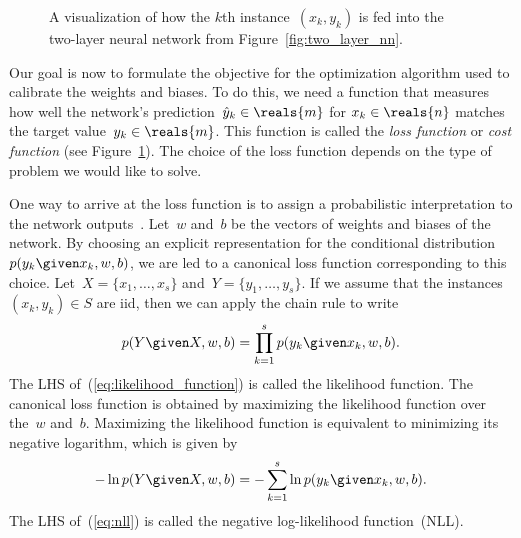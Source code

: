 \documentclass[11pt,a4paper]{article}
\numberwithin{equation}{section}
\begin{document}
\begin{figure}
\caption{A visualization of how the $k$th instance~$(x_k, y_k)$ is fed into the
two-layer neural network from
Figure~\ref{fig:two_layer_nn}.\label{fig:nn_with_loss}}
\end{figure}

Our goal is now to formulate the objective for the optimization algorithm used
to calibrate the weights and biases. To do this, we need a function that
measures how well the network's prediction~$\hat{y}_k \in \reals{m}$ for $x_k
\in \reals{n}$ matches the target value~$y_k \in \reals{m}$. This function is
called the \emph{loss function} or \emph{cost function} (see
Figure~\ref{fig:nn_with_loss}). The choice of the loss function depends on the
type of problem we would like to solve.

One way to arrive at the loss function is to assign a probabilistic
interpretation to the network outputs~\citep{ml_bishop}. Let~$w$ and~$b$ be the
vectors of weights and biases of the network. By choosing an explicit
representation for the conditional distribution~$p(y_k \given x_k, w, b)$, we
are led to a canonical loss function corresponding to this choice. Let~$X =
\{x_1, \ldots, x_s\}$ and~$Y = \{y_1, \ldots, y_s\}$. If we assume that the
instances~$(x_k, y_k) \in S$ are iid, then we can apply the chain rule to write
\[
	p(Y \given X, w, b) = \prod_{k = 1}^s p(y_k \given x_k, w, b).
	\label{eq:likelihood_function}
\]
The LHS of~(\ref{eq:likelihood_function}) is called the likelihood function. The
canonical loss function is obtained by maximizing the likelihood function over
the~$w$ and~$b$. Maximizing the likelihood function is equivalent to minimizing
its negative logarithm, which is given by
\begin{equation}
	-\ln{p(Y \given X, w, b)} = -\sum_{k = 1}^s \ln{p(y_k \given x_k, w, b)}.
	\label{eq:nll}
\end{equation}
The LHS of~(\ref{eq:nll}) is called the negative log-likelihood function~(NLL).
\end{document}
